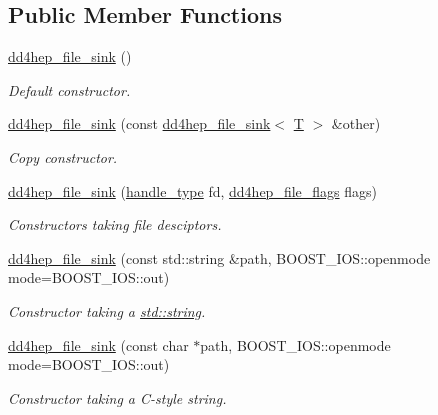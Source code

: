 \subsection*{Public Member Functions}
\begin{DoxyCompactItemize}
\item 
\hyperlink{class_d_d4hep_1_1dd4hep__file__sink_ab8a6a3d1d07d6d0488305e3a961961b2}{dd4hep\_\-file\_\-sink} ()
\begin{DoxyCompactList}\small\item\em Default constructor. \item\end{DoxyCompactList}\item 
\hyperlink{class_d_d4hep_1_1dd4hep__file__sink_ac0b723f77cc833f04bbf72fc8a5bada7}{dd4hep\_\-file\_\-sink} (const \hyperlink{class_d_d4hep_1_1dd4hep__file__sink}{dd4hep\_\-file\_\-sink}$<$ \hyperlink{class_t}{T} $>$ \&other)
\begin{DoxyCompactList}\small\item\em Copy constructor. \item\end{DoxyCompactList}\item 
\hyperlink{class_d_d4hep_1_1dd4hep__file__sink_a6dd2a25c79f1bf4d26b8c4475d58b795}{dd4hep\_\-file\_\-sink} (\hyperlink{class_t}{handle\_\-type} fd, \hyperlink{namespace_d_d4hep_a31d19f9b0ce567067d2897fbda1761e5}{dd4hep\_\-file\_\-flags} flags)
\begin{DoxyCompactList}\small\item\em Constructors taking file desciptors. \item\end{DoxyCompactList}\item 
\hyperlink{class_d_d4hep_1_1dd4hep__file__sink_a9a5a2c30b5fed19f85593ccc16349e96}{dd4hep\_\-file\_\-sink} (const std::string \&path, BOOST\_\-IOS::openmode mode=BOOST\_\-IOS::out)
\begin{DoxyCompactList}\small\item\em Constructor taking a \hyperlink{classstd_1_1string}{std::string}. \item\end{DoxyCompactList}\item 
\hyperlink{class_d_d4hep_1_1dd4hep__file__sink_aae006859555f5fe1ee2d834358476273}{dd4hep\_\-file\_\-sink} (const char $\ast$path, BOOST\_\-IOS::openmode mode=BOOST\_\-IOS::out)
\begin{DoxyCompactList}\small\item\em Constructor taking a C-\/style string. \item\end{DoxyCompactList}\item 

\end{DoxyCompactItemize}
